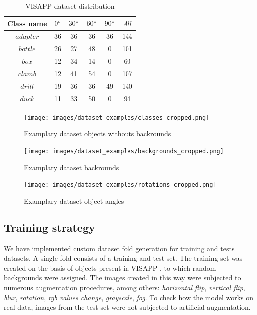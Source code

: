 \documentclass{article}
\begin{document}
\begin{center}
\begin{table}[H]
\centering
\tiny \renewcommand{\arraystretch}{2.0}
\begin{tabular}
{ |c|c|c|c|c||c| } \hline Class name & $0\degree$ & $30\degree$ & $60\degree$ & $90\degree$ & $All$  \\ [1.05ex] \hline
$adapter$ &  36 & 36 & 36 & 36 & 144 \\ \hline
$bottle$ &  26 & 27 & 48 & 0 & 101 \\ \hline
$box$ &  12 & 34 & 14 & 0 & 60 \\ \hline
$clamb$ &  12 & 41 & 54 & 0 & 107 \\ \hline
$drill$ &  19 & 36 & 36 & 49 & 140 \\ \hline
$duck$ &  11 & 33 & 50 & 0 & 94 \\ \hline
\end{tabular}
\caption{VISAPP\cite{visapp} dataset distribution}
\label{tab:visapp_class_distribution}
\end{table}
\end{center}


\begin{figure}[!htb]
    \centering
  \texttt{[image: images/dataset\_examples/classes\_cropped.png]}
  \caption{Examplary dataset objects withouts backrounds}
  \label{fig:dataset_classes}
\end{figure}

\begin{figure}
    \centering
  \texttt{[image: images/dataset\_examples/backgrounds\_cropped.png]}
  \caption{Examplary dataset  backrounds}
  \label{fig:dataset_backgrounds}
\end{figure}

\begin{figure}
    \centering
  \texttt{[image: images/dataset\_examples/rotations\_cropped.png]}
  \caption{Examplary dataset object angles}
  \label{fig:dataset_examplary_rotations}
\end{figure}

\subsection{Training strategy}
\label{sec:train_strategy}
We have implemented custom dataset fold generation for training and tests datasets. A single fold consists of a training and test set. The training set was created on the basis of objects present in VISAPP \cite{visapp}, to which random backgrounds were assigned. The images created in this way were subjected to numerous augmentation procedures, among others: \textit{horizontal} \textit{flip}, \textit{vertical flip}, \textit{blur}, \textit{rotation}, \textit{rgb values change}, \textit{grayscale}, \textit{fog}. To check how the model works on real data, images from the test set were not subjected to artificial augmentation.
\end{document}
